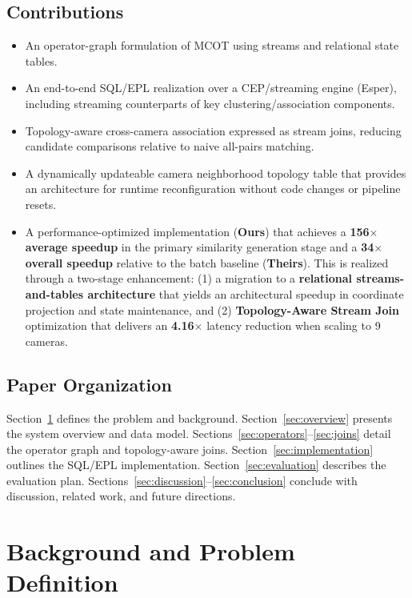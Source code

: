 \documentclass[11pt]{article}
\begin{document}
\subsection{Contributions}
\begin{itemize}[leftmargin=*]
    \item An operator-graph formulation of MCOT using streams and relational state tables.
    \item An end-to-end SQL/EPL realization over a CEP/streaming engine (Esper), including streaming counterparts of key clustering/association components.
    \item Topology-aware cross-camera association expressed as stream joins, reducing candidate comparisons relative to naive all-pairs matching.
    \item A dynamically updateable camera neighborhood topology table that provides an architecture for runtime reconfiguration without code changes or pipeline resets.
    \item A performance-optimized implementation (\textbf{Ours}) that achieves a \textbf{156$\times$ average speedup} in the primary similarity generation stage and a \textbf{34$\times$ overall speedup} relative to the batch baseline (\textbf{Theirs}). This is realized through a two-stage enhancement: (1) a migration to a \textbf{relational streams-and-tables architecture} that yields an architectural speedup in coordinate projection and state maintenance, and (2) \textbf{Topology-Aware Stream Join} optimization that delivers an \textbf{4.16$\times$} latency reduction when scaling to 9 cameras.
\end{itemize}

\subsection{Paper Organization}
Section~\ref{sec:background} defines the problem and background. Section~\ref{sec:overview} presents the system overview and data model. Sections~\ref{sec:operators}--\ref{sec:joins} detail the operator graph and topology-aware joins. Section~\ref{sec:implementation} outlines the SQL/EPL implementation. Section~\ref{sec:evaluation} describes the evaluation plan. Sections~\ref{sec:discussion}--\ref{sec:conclusion} conclude with discussion, related work, and future directions.

\section{Background and Problem Definition}\label{sec:background}
\end{document}
